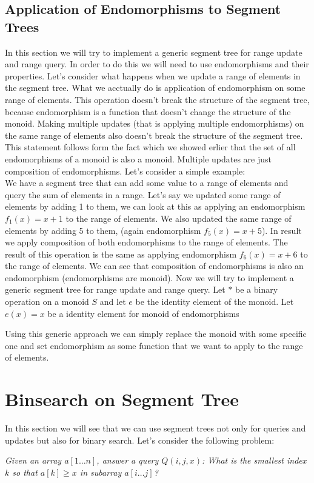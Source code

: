 \documentclass{article}
\begin{document}
\subsection{Application of Endomorphisms to Segment Trees}
In this section we will try to implement a generic segment tree for range update and range query.
In order to do this we will need to use endomorphisms and their properties.
Let's consider what happens when we update a range of elements in the segment tree.
What we acctually do is application of endomorphism on some range of elements. This operation
doesn't break the structure of the segment tree, because endomorphism is a function that doesn't change the structure of the monoid.
Making multiple updates (that is applying multiple endomorphisms) on the same range of elements 
also doesn't break the structure of the segment tree.
This statement follows form the fact which we showed erlier that the set of all endomorphisms of a monoid is also a monoid.
Multiple updates are just composition of endomorphisms.
Let's consider a simple example: \\
We have a segment tree that can add some value to a range of elements and query the sum of elements in a range.
Let's say we updated some range of elements by adding 1 to them,
we can look at this as applying an endomorphism \(f_1(x) = x + 1\) to the range of elements.
We also updated the same range of elements by adding 5 to them, (again endomorphism \(f_5(x) = x + 5\)).
In result we apply composition of both endomorphisms to the range of elements.
The result of this operation is the same as applying endomorphism \(f_6(x) = x + 6\) to the range of elements.
We can see that composition of endomorphisms is also an endomorphism (endomorphisms are monoid).
Now we will try to implement a generic segment tree for range update and range query.
Let \(\ast\) be a binary operation on a monoid \(S\) and let \(e\) be the identity element of the monoid.
Let \(e(x) = x\) be a identity element for monoid of endomorphisms

\vspace{0.1cm}

\vspace{0.1cm}
 
\FloatBarrier
Using this generic approach we can simply replace the monoid with some specific one and
set endomorphism as some function that we want to apply to the range of elements.

\section{Binsearch on Segment Tree}
In this section we will see that we can use segment trees not only for queries and updates but also for
binary search. Let's consider the following problem:
\begin{center}
    \textit{Given an array $a[1 \ldots n]$, answer a query $Q(i, j, x)$: What is the smallest index $k$ so that $a[k] \geq x$ in subarray  $a[i \ldots j]$?}\\[1ex]
\end{center}
\end{document}

